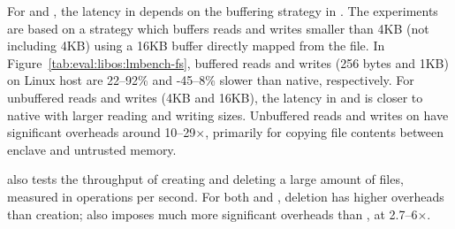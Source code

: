For  and ,
the latency in \graphene{} depends on the buffering strategy in \thelibos{}.
The experiments
are based on a strategy which
buffers reads and writes smaller than 4KB (not including 4KB)
using a 16KB buffer directly mapped from the file.
In Figure~\ref{tab:eval:libos:lmbench-fs}, buffered reads and writes (256 bytes and 1KB) on Linux host
are 22--92\% and -45--8\% slower than native, respectively.
For unbuffered reads and writes (4KB and 16KB),
the latency in \graphene{} and \graphenesgx{}
is closer to native with larger reading and writing sizes.
Unbuffered reads and writes
on \graphenesgx{}
have significant overheads around 10--29$\times$, primarily for copying file contents
between enclave and untrusted memory.

\lmbench{} also tests the throughput of creating and deleting a large amount of files,
measured in operations per second.
For both \graphene{} and \graphenesgx{}, deletion has higher overheads than creation; \graphenesgx{} also imposes much more significant overheads than \graphene{}, at 2.7--6$\times$.


